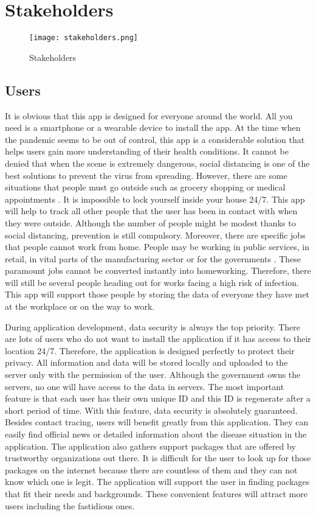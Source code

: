\section{Stakeholders}
  \begin{figure}
    \centering
    \texttt{[image: stakeholders.png]}    
    \caption{Stakeholders}
  \end{figure}

  \subsection{Users}
    \par It is obvious that this app is designed for everyone around the world. All you need is a smartphone or a wearable device to install the app. At the time when the pandemic seems to be out of control, this app is a considerable solution that helps users gain more understanding of their health conditions. It cannot be denied that when the scene is extremely dangerous, social distancing is one of the best solutions to prevent the virus from spreading. However, there are some situations that people must go outside such as grocery shopping or medical appointments \parencite{Stake1}. It is impossible to lock yourself inside your house 24/7. This app will help to track all other people that the user has been in contact with when they were outside. Although the number of people might be modest thanks to social distancing, prevention is still compulsory. Moreover, there are specific jobs that people cannot work from home. People may be working in public services, in retail, in vital parts of the manufacturing sector or for the governments \parencite{Stake2}. These paramount jobs cannot be converted instantly into homeworking. Therefore, there will still be several people heading out for works facing a high risk of infection. This app will support those people by storing the data of everyone they have met at the workplace or on the way to work.
    \par During application development,  data security is always the top priority. There are lots of users who do not want to install the application if it has access to their location 24/7. Therefore, the application is designed perfectly to protect their privacy. All information and data will be stored locally and uploaded to the server only with the permission of the user. Although the government owns the servers, no one will have access to the data in servers. The most important feature is that each user has their own unique ID and this ID is regenerate after a short period of time. With this feature, data security is absolutely guaranteed. Besides contact tracing, users will benefit greatly from this application. They can easily find official news or detailed information about the disease situation in the application. The application also gathers support packages that are offered by trustworthy organizations out there. It is difficult for the user to look up for those packages on the internet because there are countless of them and they can not know which one is legit. The application will support the user in finding packages that fit their needs and backgrounds. These convenient features will attract more users including the fastidious ones.

